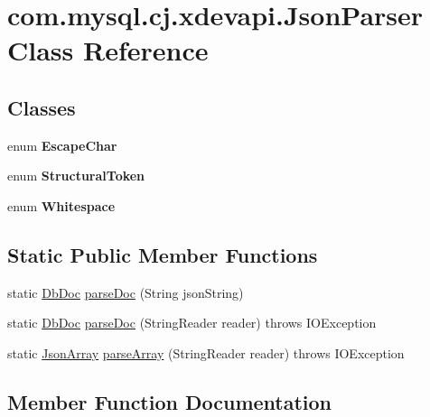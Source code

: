 \hypertarget{classcom_1_1mysql_1_1cj_1_1xdevapi_1_1_json_parser}{}\section{com.\+mysql.\+cj.\+xdevapi.\+Json\+Parser Class Reference}
\label{classcom_1_1mysql_1_1cj_1_1xdevapi_1_1_json_parser}
\subsection*{Classes}
\begin{DoxyCompactItemize}
\item 
enum {\bfseries Escape\+Char}
\item 
enum {\bfseries Structural\+Token}
\item 
enum {\bfseries Whitespace}
\end{DoxyCompactItemize}
\subsection*{Static Public Member Functions}
\begin{DoxyCompactItemize}
\item 
static \mbox{\hyperlink{interfacecom_1_1mysql_1_1cj_1_1xdevapi_1_1_db_doc}{Db\+Doc}} \mbox{\hyperlink{classcom_1_1mysql_1_1cj_1_1xdevapi_1_1_json_parser_ad779f7c1563d2bcca7481d3655519501}{parse\+Doc}} (String json\+String)
\item 
static \mbox{\hyperlink{interfacecom_1_1mysql_1_1cj_1_1xdevapi_1_1_db_doc}{Db\+Doc}} \mbox{\hyperlink{classcom_1_1mysql_1_1cj_1_1xdevapi_1_1_json_parser_a09f9af593473756e34e7e87fb3022cc4}{parse\+Doc}} (String\+Reader reader)  throws I\+O\+Exception 
\item 
static \mbox{\hyperlink{classcom_1_1mysql_1_1cj_1_1xdevapi_1_1_json_array}{Json\+Array}} \mbox{\hyperlink{classcom_1_1mysql_1_1cj_1_1xdevapi_1_1_json_parser_a93178bb203463520aef663bd3d411ea2}{parse\+Array}} (String\+Reader reader)  throws I\+O\+Exception 
\end{DoxyCompactItemize}


\subsection{Member Function Documentation}
\mbox{\label{classcom_1_1mysql_1_1cj_1_1xdevapi_1_1_json_parser_a93178bb203463520aef663bd3d411ea2}} 
